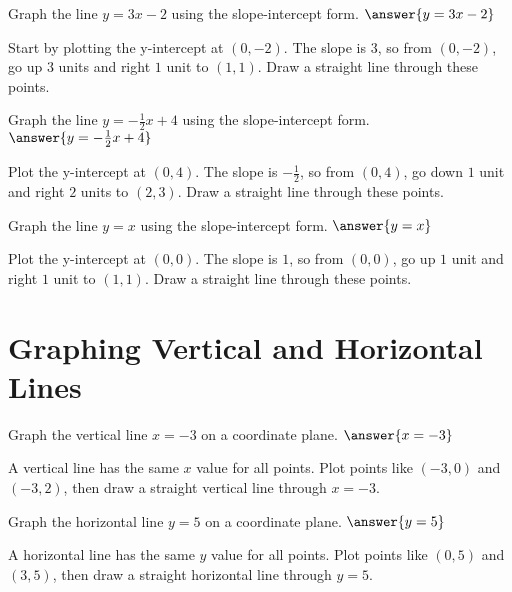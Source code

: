 \documentclass{ximera}
\begin{document}
\begin{problem}
Graph the line $y = 3x - 2$ using the slope-intercept form. $\answer{y = 3x - 2}$
\begin{feedback}
Start by plotting the y-intercept at $(0, -2)$. The slope is $3$, so from $(0, -2)$, go up $3$ units and right $1$ unit to $(1, 1)$. Draw a straight line through these points.
\end{feedback}
\end{problem}

\begin{problem}
Graph the line $y = -\frac{1}{2}x + 4$ using the slope-intercept form. $\answer{y = -\frac{1}{2}x + 4}$
\begin{feedback}
Plot the y-intercept at $(0, 4)$. The slope is $-\frac{1}{2}$, so from $(0, 4)$, go down $1$ unit and right $2$ units to $(2, 3)$. Draw a straight line through these points.
\end{feedback}
\end{problem}

\begin{problem}
Graph the line $y = x$ using the slope-intercept form. $\answer{y = x}$
\begin{feedback}
Plot the y-intercept at $(0, 0)$. The slope is $1$, so from $(0, 0)$, go up $1$ unit and right $1$ unit to $(1, 1)$. Draw a straight line through these points.
\end{feedback}
\end{problem}



\section*{Graphing Vertical and Horizontal Lines}

\begin{problem}
Graph the vertical line $x = -3$ on a coordinate plane. $\answer{x = -3}$
\begin{feedback}
A vertical line has the same $x$ value for all points. Plot points like $(-3, 0)$ and $(-3, 2)$, then draw a straight vertical line through $x = -3$.
\end{feedback}
\end{problem}

\begin{problem}
Graph the horizontal line $y = 5$ on a coordinate plane. $\answer{y = 5}$
\begin{feedback}
A horizontal line has the same $y$ value for all points. Plot points like $(0, 5)$ and $(3, 5)$, then draw a straight horizontal line through $y = 5$.
\end{feedback}
\end{problem}
\end{document}
